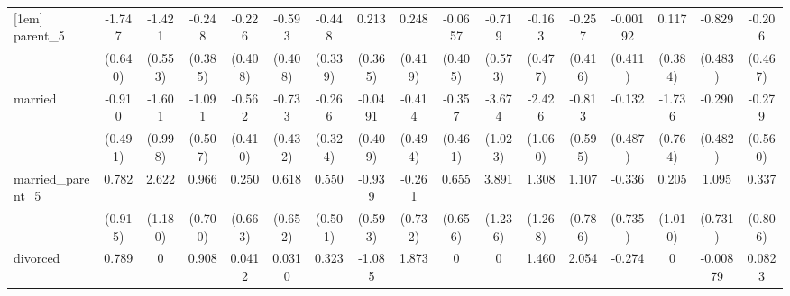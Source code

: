 {\begin{tabular}{l*{16}{c}}
[1em]
parent\_5            &      -1.747\sym{**} &      -1.421\sym{*}  &      -0.248         &      -0.226         &      -0.593         &      -0.448         &       0.213         &       0.248         &     -0.0657         &      -0.719         &      -0.163         &      -0.257         &    -0.00192         &       0.117         &      -0.829         &      -0.206         \\
                    &     (0.640)         &     (0.553)         &     (0.385)         &     (0.408)         &     (0.408)         &     (0.339)         &     (0.365)         &     (0.419)         &     (0.405)         &     (0.573)         &     (0.477)         &     (0.416)         &     (0.411)         &     (0.384)         &     (0.483)         &     (0.467)         \\
[1em]
married             &      -0.910         &      -1.601         &      -1.091\sym{*}  &      -0.562         &      -0.733         &      -0.266         &     -0.0491         &      -0.414         &      -0.357         &      -3.674\sym{***}&      -2.426\sym{*}  &      -0.813         &      -0.132         &      -1.736\sym{*}  &      -0.290         &      -0.279         \\
                    &     (0.491)         &     (0.998)         &     (0.507)         &     (0.410)         &     (0.432)         &     (0.324)         &     (0.409)         &     (0.494)         &     (0.461)         &     (1.023)         &     (1.060)         &     (0.595)         &     (0.487)         &     (0.764)         &     (0.482)         &     (0.560)         \\
[1em]
married\_parent\_5    &       0.782         &       2.622\sym{*}  &       0.966         &       0.250         &       0.618         &       0.550         &      -0.939         &      -0.261         &       0.655         &       3.891\sym{**} &       1.308         &       1.107         &      -0.336         &       0.205         &       1.095         &       0.337         \\
                    &     (0.915)         &     (1.180)         &     (0.700)         &     (0.663)         &     (0.652)         &     (0.501)         &     (0.593)         &     (0.732)         &     (0.656)         &     (1.236)         &     (1.268)         &     (0.786)         &     (0.735)         &     (1.010)         &     (0.731)         &     (0.806)         \\
[1em]
divorced            &       0.789         &           0         &       0.908         &      0.0412         &      0.0310         &       0.323         &      -1.085         &       1.873\sym{***}&           0         &           0         &       1.460\sym{*}  &       2.054\sym{**} &      -0.274         &           0         &    -0.00879         &      0.0823         \\

\end{tabular}}
